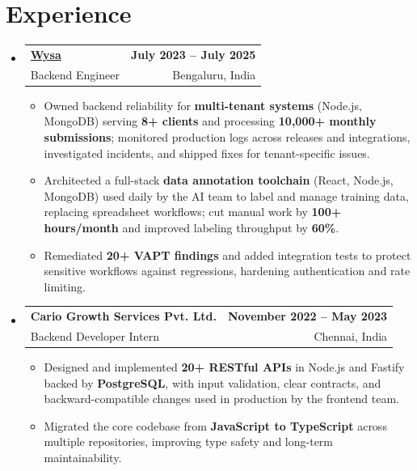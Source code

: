 \documentclass[letterpaper,10pt]{article}
\makeatletter
\newcommand{\resumeItem}[1]{
  \item\small{#1\vspace{-1pt}}
}
\newcommand{\resumeSubheading}[4]{
  \vspace{1pt}\item
    \begin{tabular*}{0.985\textwidth}[t]{l@{\extracolsep{\fill}}r}
      \textbf{#1} & \textbf{\small #2} \\
      {\small\color{ResumeSlate} #3} & {\small\color{ResumeSlate} #4} \\
    \end{tabular*}\vspace{-6pt}
}
\newcommand{\resumeSubHeadingListStart}{\begin{itemize}[leftmargin=0.0in, label={}, itemsep=2pt, topsep=2pt]}
\newcommand{\resumeSubHeadingListEnd}{\end{itemize}}
\newcommand{\resumeItemListStart}{\begin{itemize}[leftmargin=0.18in, itemsep=2pt, topsep=1pt]}
\newcommand{\resumeItemListEnd}{\end{itemize}\vspace{-4pt}}
\makeatother
\begin{document}
\section{Experience}
\resumeSubHeadingListStart
  \resumeSubheading
    {\href{https://www.wysa.io}{Wysa}}{July 2023 -- July 2025}
    {Backend Engineer}{Bengaluru, India}
    \resumeItemListStart
      \resumeItem{Owned backend reliability for \textbf{multi-tenant systems} (Node.js, MongoDB) serving \textbf{8+ clients} and processing \textbf{10{,}000+ monthly submissions}; monitored production logs across releases and integrations, investigated incidents, and shipped fixes for tenant-specific issues.}
      \resumeItem{Architected a full-stack \textbf{data annotation toolchain} (React, Node.js, MongoDB) used daily by the AI team to label and manage training data, replacing spreadsheet workflows; cut manual work by \textbf{100+ hours/month} and improved labeling throughput by \textbf{60\%}.}
      \resumeItem{Remediated \textbf{20+ VAPT findings} and added integration tests to protect sensitive workflows against regressions, hardening authentication and rate limiting.}
    \resumeItemListEnd
  \resumeSubheading
    {Cario Growth Services Pvt. Ltd.}{November 2022 -- May 2023}
    {Backend Developer Intern}{Chennai, India}
    \resumeItemListStart
      \resumeItem{Designed and implemented \textbf{20+ RESTful APIs} in Node.js and Fastify backed by \textbf{PostgreSQL}, with input validation, clear contracts, and backward-compatible changes used in production by the frontend team.}
      \resumeItem{Migrated the core codebase from \textbf{JavaScript to TypeScript} across multiple repositories, improving type safety and long-term maintainability.}
    \resumeItemListEnd
\resumeSubHeadingListEnd
\vspace{-4pt}
\end{document}
